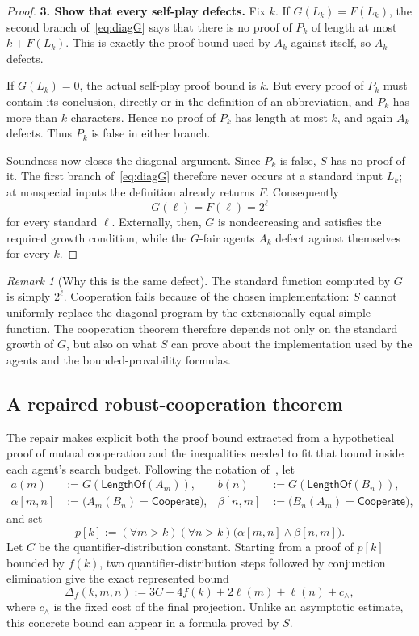 \documentclass[11pt]{article}
\theoremstyle{definition}
\theoremstyle{remark}
\newtheorem{remark}[theorem]{Remark}
\newcommand{\elln}{\ell}
\newcommand{\Coop}{\mathsf{Cooperate}}
\newcommand{\Len}{\mathsf{LengthOf}}
\begin{document}
\begin{proof}
\medskip
\noindent
\textbf{3. Show that every self-play defects.}
Fix $k$.  If $G(L_k)=F(L_k)$, the second branch of~\eqref{eq:diagG} says that there is no proof of $P_k$ of length at most $k+F(L_k)$.  This is exactly the proof bound used by $A_k$ against itself, so $A_k$ defects.

If $G(L_k)=0$, the actual self-play proof bound is $k$.  But every proof of $P_k$ must contain its conclusion, directly or in the definition of an abbreviation, and $P_k$ has more than $k$ characters.  Hence no proof of $P_k$ has length at most $k$, and again $A_k$ defects.  Thus $P_k$ is false in either branch.

Soundness now closes the diagonal argument.  Since $P_k$ is false, $S$ has no proof of it.  The first branch of~\eqref{eq:diagG} therefore never occurs at a standard input $L_k$; at nonspecial inputs the definition already returns $F$.  Consequently
\[
  G(\ell)=F(\ell)=2^\ell
\]
for every standard $\ell$.  Externally, then, $G$ is nondecreasing and satisfies the required growth condition, while the $G$-fair agents $A_k$ defect against themselves for every $k$.
\end{proof}

\begin{remark}[Why this is the same defect]
The standard function computed by $G$ is simply $2^\ell$.  Cooperation fails because of the chosen implementation: $S$ cannot uniformly replace the diagonal program by the extensionally equal simple function.  The cooperation theorem therefore depends not only on the standard growth of $G$, but also on what $S$ can prove about the implementation used by the agents and the bounded-provability formulas.
\end{remark}

\subsection{A repaired robust-cooperation theorem}

The repair makes explicit both the proof bound extracted from a hypothetical proof of mutual cooperation and the inequalities needed to fit that bound inside each agent's search budget.  Following the notation of~\cite{Critch}, let
\[
\begin{aligned}
  a(m)&:=G(\Len(A_m)), &
  b(n)&:=G(\Len(B_n)),\\
  \alpha[m,n]&:=\bigl(A_m(B_n)=\Coop\bigr), &
  \beta[n,m]&:=\bigl(B_n(A_m)=\Coop\bigr),
\end{aligned}
\]
and set
\[
  p[k]:=(\forall m>k)(\forall n>k)
  \bigl(\alpha[m,n]\wedge\beta[n,m]\bigr).
\]
Let $C$ be the quantifier-distribution constant.  Starting from a proof of $p[k]$ bounded by $f(k)$, two quantifier-distribution steps followed by conjunction elimination give the exact represented bound
\begin{equation}\label{eq:Delta}
  \Delta_f(k,m,n)
  :=3C+4f(k)+2\elln(m)+\elln(n)+c_{\wedge},
\end{equation}
where $c_{\wedge}$ is the fixed cost of the final projection.  Unlike an asymptotic estimate, this concrete bound can appear in a formula proved by $S$.
\end{document}
